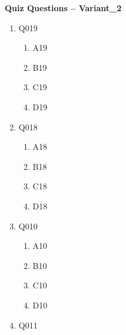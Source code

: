 \documentclass[12pt]{article}
\begin{document}
\begin{center}
    \Large\textbf{Quiz Questions -- Variant\_2}
\end{center}

\begin{enumerate}

    \item Q019
    \begin{enumerate}[label=(\Alph*)]
        
        \item A19
        
        \item B19
        
        \item C19
        
        \item D19
        
    \end{enumerate}

    \item Q018
    \begin{enumerate}[label=(\Alph*)]
        
        \item A18
        
        \item B18
        
        \item C18
        
        \item D18
        
    \end{enumerate}

    \item Q010
    \begin{enumerate}[label=(\Alph*)]
        
        \item A10
        
        \item B10
        
        \item C10
        
        \item D10
        
    \end{enumerate}

    \item Q011
    \begin{enumerate}[label=(\Alph*)]
        

\end{enumerate}
\end{enumerate}
\end{document}
